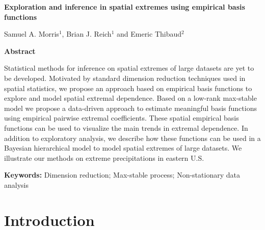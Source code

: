 \documentclass[12pt]{article}
\begin{document}
\thispagestyle{empty}
\baselineskip=28pt
\vskip 5mm
\begin{center} {\Large{\bf Exploration and inference in spatial extremes using empirical basis functions}}
\end{center}

\baselineskip=12pt

\vskip 5mm

\begin{center}
\large
Samuel A. Morris$^{1}$, Brian J. Reich$^1$ and Emeric Thibaud$^2$
\end{center}


\baselineskip=17pt
\vskip 4mm
\vskip 6mm

\begin{center}
{\large{\bf Abstract}}
\end{center}

Statistical methods for inference on spatial extremes of large datasets are yet to be developed. Motivated by standard dimension reduction techniques used in spatial statistics, we propose an approach based on empirical basis functions to explore and model spatial extremal dependence. Based on a low-rank max-stable model we propose a data-driven approach to estimate meaningful basis functions using empirical pairwise extremal coefficients. These spatial empirical basis functions can be used to visualize the main trends in extremal dependence. In addition to exploratory analysis, we describe how these functions can be used in a Bayesian hierarchical model to model spatial extremes of large datasets. We illustrate our methods on extreme precipitations in eastern U.S.
\baselineskip=16pt

\bigskip\noindent
{\bf Keywords:} Dimension reduction; Max-stable process; Non-stationary data analysis\\

\baselineskip=24pt


\newpage


\section{Introduction}\label{ebs:intro}
\end{document}
